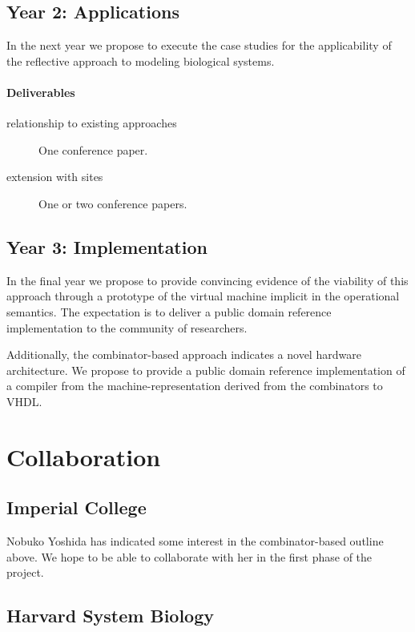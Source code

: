 \documentclass[]{amsart}
\theoremstyle{definition}
\theoremstyle{remark}
\numberwithin{equation}{subsection}
\begin{document}
\subsection{Year 2: Applications}

In the next year we propose to execute the case studies for the
applicability of the reflective approach to modeling biological systems.

\paragraph{Deliverables}

\begin{description}
	\item [relationship to existing approaches] One conference paper.
	\item [extension with sites] One or two conference papers.
\end{description}

\subsection{Year 3: Implementation}

In the final year we propose to provide convincing evidence of the
viability of this approach through a prototype of the virtual machine
implicit in the operational semantics. The expectation is to deliver a
public domain reference implementation to the community of
researchers.

Additionally, the combinator-based approach indicates a novel hardware
architecture. We propose to provide a public domain reference
implementation of a compiler from the machine-representation derived
from the combinators to VHDL.

\section{Collaboration}

\subsection{Imperial College}

Nobuko Yoshida has indicated some interest in the combinator-based
outline above. We hope to be able to collaborate with her in the first
phase of the project.

\subsection{Harvard System Biology}
\end{document}
